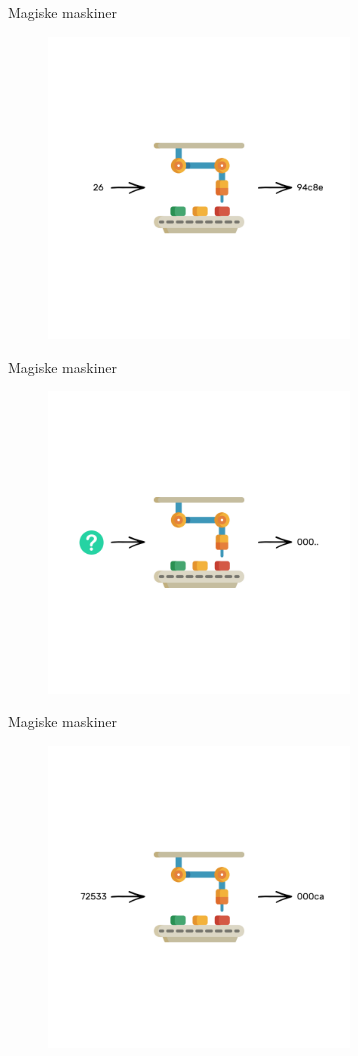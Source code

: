 \documentclass[usenames, dvipsnames]{beamer}
\begin{document}
  \begin{frame}{Magiske maskiner}
    \begin{figure}[ht!]
    \centering
    \includegraphics[width=80mm]{images/magic_machine_output2.png}
    \end{figure}
  \end{frame}
  \begin{frame}{Magiske maskiner}
    \begin{figure}[ht!]
    \centering
    \includegraphics[width=80mm]{images/magic_machine_unknown_input.png}
    \end{figure}
  \end{frame}
  \begin{frame}{Magiske maskiner}
    \begin{figure}[ht!]
    \centering
    \includegraphics[width=80mm]{images/magic_machine_3zeros.png}
    \end{figure}
  \end{frame}
\end{document}
